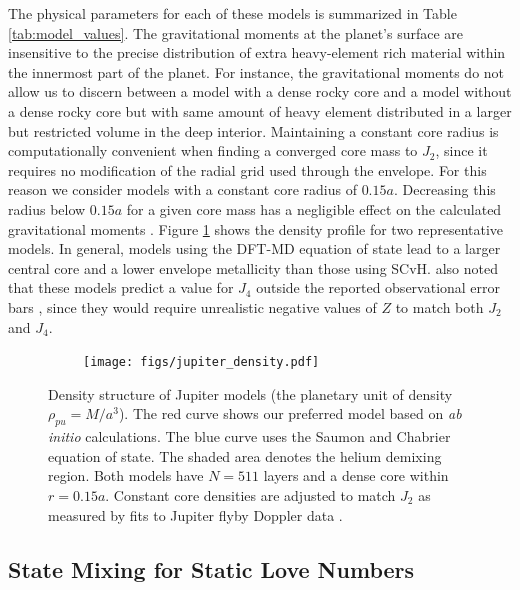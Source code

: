 The physical parameters for each of these models is summarized in Table
\ref{tab:model_values}. The gravitational moments at the planet's surface are
insensitive to the precise distribution of extra heavy-element rich material within the
innermost part of the planet. For instance, 
the gravitational moments do not allow us to discern between a model
with a dense rocky core and a model without a dense rocky core but with same amount
of heavy element distributed in a larger but restricted volume in the deep interior. 
Maintaining a constant core radius is
computationally convenient when finding a converged core mass to $J_{2}$, since it
requires no modification of the radial grid used through the envelope. For this
reason we consider models with a constant core radius of $0.15a$. Decreasing this
radius below $0.15a$ for a given core mass has a negligible effect on the calculated
gravitational moments \citep{hubbard2016}. Figure \ref{fig:density_jupiter} shows
the density profile for two representative models.  In general, models using the
DFT-MD equation of state lead to a larger central core and a lower envelope
metallicity than those using SCvH.  \citet{hubbard2016} also noted that these models
predict a value for $J_4$ outside the reported observational error bars
\citep{jacobson2003}, since they would require unrealistic negative values of $Z$ to
match both $J_2$ and $J_4$.

\begin{figure}[h!]  
  \centering
    \texttt{[image: figs/jupiter\_density.pdf]}
\caption{   Density structure of Jupiter models (the planetary unit of
density $\rho_{pu}=M/a^3$).  The red curve shows our preferred
    model based on \textit{ab initio} calculations. The blue curve uses the Saumon and
    Chabrier equation of state. The shaded area denotes the helium demixing region.
    Both models have $N=511$ layers and a dense core within $r=0.15a$.  Constant core
    densities are adjusted to match $J_2$ as measured by fits to Jupiter flyby Doppler
    data \citep{jacobson2003}.}
\label{fig:density_jupiter}
\end{figure}

\subsection{State Mixing for Static Love Numbers} \label{state_mixing}

